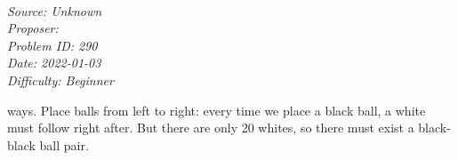 \SSbreak\\
\emph{Source: Unknown}\\
\emph{Proposer: \Pnjoy}\\ %
\emph{Problem ID: 290}\\
\emph{Date: 2022-01-03}\\
\emph{Difficulty: Beginner}\\
\SSbreak

\bigskip

\begin{solution}\hfil\medskip
  
     ways. Place balls from left to right: every time we place a black ball, a white 
    must follow right after. But there are only 20 whites, so there must exist a black-black 
    ball pair. 
\end{solution}\bigskip
